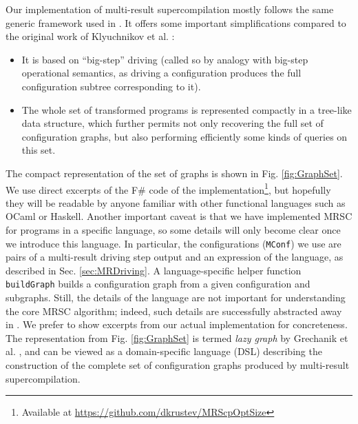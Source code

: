 \documentclass[submission,copyright,creativecommons]{eptcs}
\begin{document}
Our implementation of multi-result supercompilation mostly follows the same
generic framework used in \cite{Romanenko2014StagedMRSC,krustev2014approach}.
It offers some important simplifications compared to the original work
of Klyuchnikov et al. \cite{KlyuchnikovMRSCBranch,Klyuchnikov:META2012:MRSC}:
\begin{itemize}
  \item It is based on ``big-step'' driving (called so by analogy with big-step
    operational semantics, as driving a configuration produces
    the full configuration subtree corresponding to it).
  \item The whole set of transformed programs is represented compactly
    in a tree-like data structure, which further permits not only
    recovering the full set of configuration graphs, but also
    performing efficiently some kinds of queries on this set.
\end{itemize}
The compact representation of the set of graphs is shown in Fig. \ref{fig:GraphSet}.
We use direct excerpts of the F\# code of the implementation\footnote{Available at
\url{https://github.com/dkrustev/MRScpOptSize}}, but hopefully
they will be readable by anyone familiar with other functional languages such as OCaml or Haskell.
Another important caveat is that we have implemented MRSC for programs in a specific language,
so some details will only become clear once we introduce this language.
In particular, the configurations (\verb|MConf|) we use are 
pairs of a multi-result driving step output and an expression of the language,
as described in Sec. \ref{sec:MRDriving}.
A language-specific helper function \verb|buildGraph| builds a configuration graph
from a given configuration and subgraphs.
Still, the details of the language are not important for understanding the core
MRSC algorithm; indeed, such details are successfully abstracted away in \cite{Romanenko2014StagedMRSC,krustev2014approach}.
We prefer to show excerpts from our actual implementation for concreteness.
The representation from Fig. \ref{fig:GraphSet} is termed \emph{lazy graph} by Grechanik et al. \cite{Romanenko2014StagedMRSC},
and can be viewed as a domain-specific language (DSL) describing the construction of the
complete set of configuration graphs produced by multi-result supercompilation.
\end{document}
